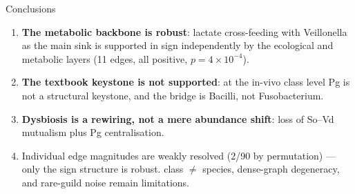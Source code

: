 \documentclass[
  ignorenonframetext,
  aspectratio=169,
]{beamer}
\providecommand{\tightlist}{%
  \setlength{\itemsep}{0pt}\setlength{\parskip}{0pt}}
\begin{document}
\begin{frame}{Conclusions}
\protect\hypertarget{conclusions}{}
\begin{enumerate}
\tightlist
\item
  \textbf{The metabolic backbone is robust}: lactate cross-feeding with
  Veillonella as the main sink is supported in sign independently by the
  ecological and metabolic layers (11 edges, all positive,
  \(p=4\times10^{-4}\)).
\item
  \textbf{The textbook keystone is not supported}: at the in-vivo class
  level Pg is not a structural keystone, and the bridge is Bacilli, not
  Fusobacterium.
\item
  \textbf{Dysbiosis is a rewiring, not a mere abundance shift}: loss of
  So--Vd mutualism plus Pg centralisation.
\item
  Individual edge magnitudes are weakly resolved (2/90 by permutation)
  --- only the sign structure is robust. class \(\neq\) species,
  dense-graph degeneracy, and rare-guild noise remain limitations.
\end{enumerate}
\end{frame}
\end{document}
